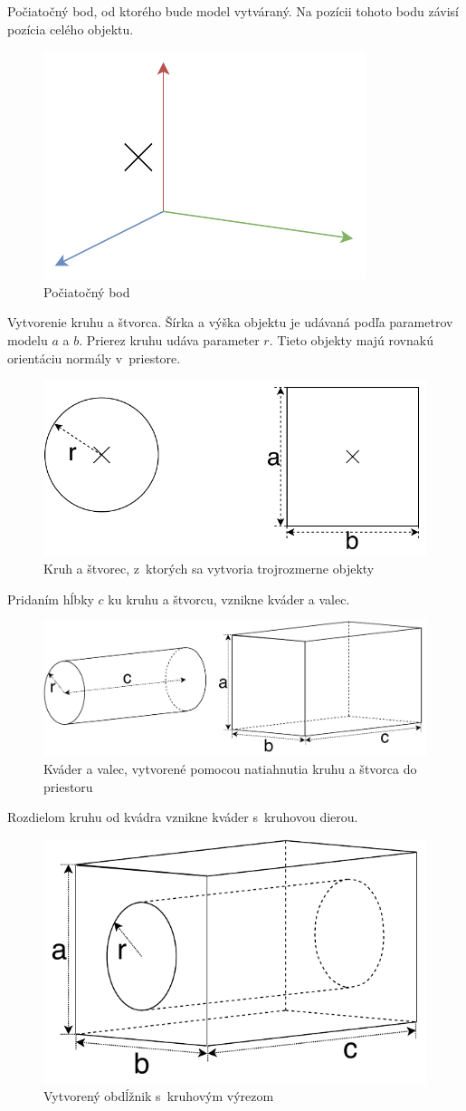 Počiatočný bod, od ktorého bude model vytváraný. Na pozícii tohoto bodu závisí pozícia celého objektu.\nopagebreak
\begin{figure}[H]
	\centering
	\includegraphics[height=0.3\textwidth]{obrazky-figures/Examples/A1.pdf}
	\caption{Počiatočný bod}
	\label{fig:A1}
\end{figure}
Vytvorenie kruhu a štvorca. Šírka a výška objektu je udávaná podľa parametrov modelu $a$ a $b$. Prierez kruhu udáva parameter $r$. Tieto objekty majú rovnakú orientáciu normály v~priestore.
\nopagebreak
\begin{figure}[H]
	\centering
	\includegraphics[height=0.3\textwidth]{obrazky-figures/Examples/A2.pdf}
	\caption{Kruh a štvorec,  z~ktorých sa vytvoria trojrozmerne objekty}
	\label{fig:A2}
\end{figure}
Pridaním hĺbky $c$ ku kruhu a štvorcu, vznikne kváder a valec.
\nopagebreak
\begin{figure}[H]
	\centering
	\includegraphics[height=0.3\textwidth]{obrazky-figures/Examples/A3.pdf}
	\caption{Kváder a valec, vytvorené pomocou natiahnutia kruhu a štvorca do priestoru}
	\label{fig:A3}
\end{figure}
Rozdielom kruhu od kvádra vznikne kváder s~kruhovou dierou.
\nopagebreak
\begin{figure}[H]
	\centering
	\includegraphics[height=0.3\textwidth]{obrazky-figures/Examples/A4.pdf}
	\caption{Vytvorený obdĺžnik s~kruhovým výrezom}
	\label{fig:A4}
\end{figure}

